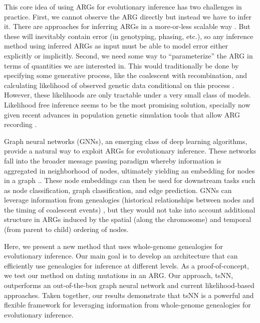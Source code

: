 This core idea of using ARGs for evolutionary inference has two challenges in practice. 
First, we cannot observe the ARG directly but instead we have to infer it. 
There are approaches for inferring ARGs in a more-or-less scalable way \citep{speidel_inferring_2021, kelleher_inferring_2019, zhang_biobank-scale_2023}. 
But these will inevitably contain error (\eg in genotyping, phasing, etc.),
so any inference method using inferred ARGs as input must be able to model error either explicitly or implicitly.
Second, we need some way to ``parameterize'' the ARG in terms of quantities we are interested in. 
This would traditionally be done by specifying some generative process, like the coalescent with recombination,
and calculating likelihood of observed genetic data conditional on this process \citep{fan_likelihood-based_2023}. 
However, these likelihoods are only tractable under a very small class of models. 
Likelihood free inference seems to be the most promising solution,
specially now given recent advances in population genetic simulation tools that allow ARG recording \citep{haller_tree-sequence_2019, kelleher_efficient_2016, ralph_efficiently_2020}. 

Graph neural networks (GNNs), an emerging class of deep learning algorithms, provide a natural way to exploit ARGs for evolutionary inference.
These networks fall into the broader message passing paradigm whereby information is aggregated in neighborhood of nodes,
ultimately yielding an embedding for nodes in a graph \citep{bronstein_geometric_2017, battaglia_relational_2018, hamilton_inductive_2018}..
These node embeddings can then be used for downstream tasks such as node classification, graph classification, and edge prediction.
GNNs can leverage information from genealogies (\ie historical relationships between nodes and the timing of coalescent events) \citep{korfmann_simultaneous_2023},
but they would not take into account additional structure in ARGs induced by the spatial (along the chromosome) and temporal (from parent to child) ordering of nodes.

Here, we present a new method that uses whole-genome genealogies for evolutionary inference.
Our main goal is to develop an architecture that can efficiently use genealogies for inference at different levels.
As a proof-of-concept, we test our method on dating mutations in an ARG.
Our approach, tsNN, outperforms an out-of-the-box graph neural network and current likelihood-based approaches.
Taken together, our results demonstrate that tsNN is a powerful and flexible framework for leveraging information from whole-genome genealogies for evolutionary inference.

